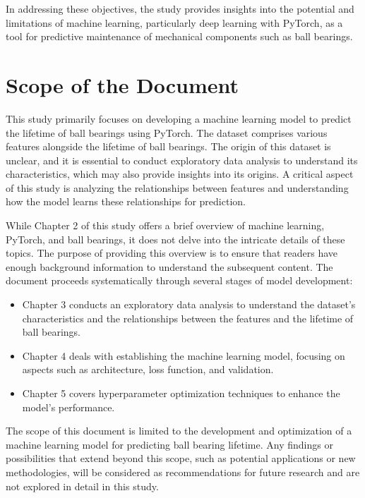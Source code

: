 In addressing these objectives, the study provides insights into the potential and limitations of machine learning, particularly deep learning with PyTorch, as a tool for predictive maintenance of mechanical components such as ball bearings.


\section{Scope of the Document}

This study primarily focuses on developing a machine learning model to predict the lifetime of ball bearings using PyTorch. The dataset comprises various features alongside the lifetime of ball bearings. The origin of this dataset is unclear, and it is essential to conduct exploratory data analysis to understand its characteristics, which may also provide insights into its origins. A critical aspect of this study is analyzing the relationships between features and understanding how the model learns these relationships for prediction.

While Chapter 2 of this study offers a brief overview of machine learning, PyTorch, and ball bearings, it does not delve into the intricate details of these topics. The purpose of providing this overview is to ensure that readers have enough background information to understand the subsequent content. The document proceeds systematically through several stages of model development:
\begin{itemize}
    \item Chapter 3 conducts an exploratory data analysis to understand the dataset's characteristics and the relationships between the features and the lifetime of ball bearings.
    \item Chapter 4 deals with establishing the machine learning model, focusing on aspects such as architecture, loss function, and validation.
    \item Chapter 5 covers hyperparameter optimization techniques to enhance the model's performance.
\end{itemize}

The scope of this document is limited to the development and optimization of a machine learning model for predicting ball bearing lifetime. Any findings or possibilities that extend beyond this scope, such as potential applications or new methodologies, will be considered as recommendations for future research and are not explored in detail in this study.
